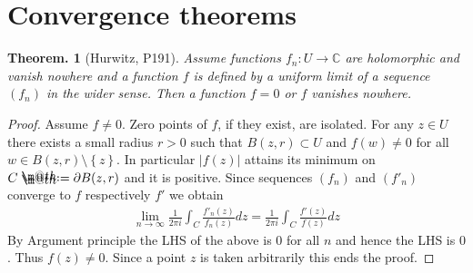 \documentclass[openany, a4paper, oneside]{jsbook}
\makeatletter
\newcommand*{\defeq}{\mathrel{\rlap{%
\raisebox{0.3ex}{$\m@th\cdot$}}%
\raisebox{-0.3ex}{$\m@th\cdot$}}%
=}
\theoremstyle{break}
\theoremstyle{breakdefn}
\newtheorem{thm}{Theorem.}[section]
\newcommand{\abs}[1]{\left|#1\right|}
\newcommand{\cbk}[1]{\left\{#1\right\}}
\newcommand{\bbC}{\mathbb{C}}
\makeatother
\begin{document}
\section{Convergence theorems}


\begin{thm}[Hurwitz, \cite{LarsAhlfors1} P191]
 Assume functions $f_n \colon U \to \bbC$ are holomorphic and vanish nowhere
 and a function $f$ is defined by a uniform limit of a sequence $(f_n)$ in the wider sense.
 Then a function $f = 0$ or $f$ vanishes nowhere.
\end{thm}
\begin{proof}
 Assume $f \neq 0$.
 Zero points of $f$, if they exist, are isolated.
 For any $z \in U$ there exists a small radius $r>0$ such that $B (z, r) \subset U$ and $f (w) \neq 0$ for all $w \in B (z, r) \setminus \cbk{z}$.
 In particular $\abs{f (z)}$ attains its minimum on $C \defeq \partial B (z, r)$ and it is positive.
 Since sequences $(f_n)$ and $(f'_n)$ converge to $f$ respectively $f'$ we obtain
 \begin{align}
  \lim_{n \to \infty} \frac{1}{2 \pi i} \int_C \frac{f'_n (z)}{f_n (z)} dz
  =
  \frac{1}{2 \pi i} \int_C \frac{f' (z)}{f (z)} dz
 \end{align}
 By Argument principle the LHS of the above is $0$ for all $n$ and hence the LHS is $0$.
 Thus $f (z) \neq 0$.
 Since a point $z$ is taken arbitrarily this ends the proof.
\end{proof}
\end{document}
